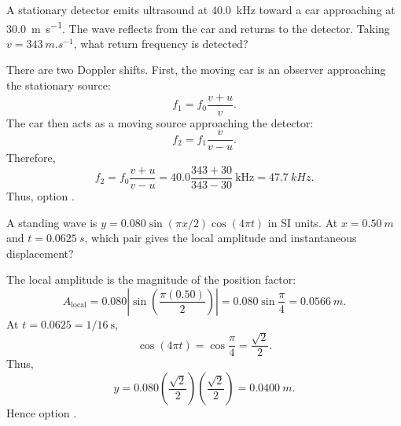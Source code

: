 \begin{quizquestion}[
  id=phy104-wave-053,
  topic=waves-and-sound,
  difficulty=challenge,
  marks=3,
  correct=E,
  tags={doppler-effect,reflection,ultrasound},
  outcome={Calculate a double Doppler shift from a moving reflector}
]
  A stationary detector emits ultrasound at \SI{40.0}{kHz} toward a car approaching at \SI{30.0}{m.s^{-1}}. The wave reflects from the car and returns to the detector. Taking \(v=\SI{343}{m.s^{-1}}\), what return frequency is detected?
\end{quizquestion}
\begin{quizsolution}
  There are two Doppler shifts. First, the moving car is an observer approaching the stationary source:
    \[
      f_1=f_0\frac{v+u}{v}.
    \]
    The car then acts as a moving source approaching the detector:
    \[
      f_2=f_1\frac{v}{v-u}.
    \]
    Therefore,
    \[
      f_2=f_0\frac{v+u}{v-u}
      =40.0\frac{343+30}{343-30}\ \mathrm{kHz}
      =\SI{47.7}{kHz}.
    \]
    Thus, option \textbf{\quizcorrectletter}.
\end{quizsolution}

\begin{quizquestion}[
  id=phy104-wave-054,
  topic=waves-and-sound,
  difficulty=challenge,
  marks=3,
  correct=A,
  tags={standing-wave,local-amplitude,instantaneous-displacement},
  outcome={Evaluate local amplitude and displacement in a standing wave}
]
  A standing wave is \(y=0.080\sin(\pi x/2)\cos(4\pi t)\) in SI units. At \(x=\SI{0.50}{m}\) and \(t=\SI{0.0625}{s}\), which pair gives the local amplitude and instantaneous displacement?
\end{quizquestion}
\begin{quizsolution}
  The local amplitude is the magnitude of the position factor:
    \[
      A_{\mathrm{local}}=0.080\left|\sin\left(\frac{\pi(0.50)}{2}\right)\right|
      =0.080\sin\frac{\pi}{4}
      =\SI{0.0566}{m}.
    \]
    At \(t=0.0625=1/16\ \mathrm{s}\),
    \[
      \cos(4\pi t)=\cos\frac{\pi}{4}=\frac{\sqrt2}{2}.
    \]
    Thus,
    \[
      y=0.080\left(\frac{\sqrt2}{2}\right)\left(\frac{\sqrt2}{2}\right)
      =\SI{0.0400}{m}.
    \]
    Hence option \textbf{\quizcorrectletter}.
\end{quizsolution}

